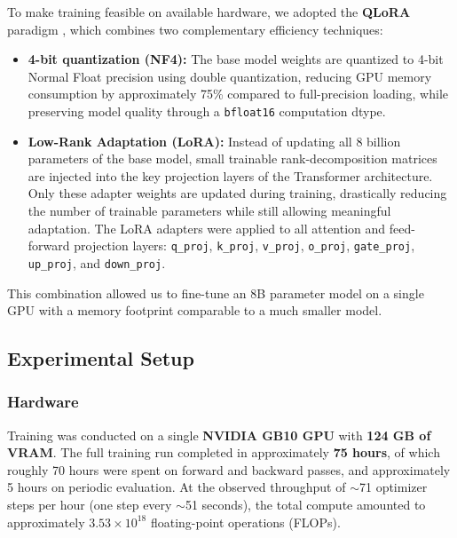 \documentclass[12pt,a4paper]{report}
\begin{document}
To make training feasible on available hardware, we adopted the
\textbf{QLoRA} paradigm \cite{dettmers2023qlora}, which combines two
complementary efficiency techniques:

\begin{itemize}
    \item \textbf{4-bit quantization (NF4):} The base model weights are
    quantized to 4-bit Normal Float precision using double quantization,
    reducing GPU memory consumption by approximately 75\% compared to
    full-precision loading, while preserving model quality through a
    \texttt{bfloat16} computation dtype.

    \item \textbf{Low-Rank Adaptation (LoRA):} Instead of updating all 8
    billion parameters of the base model, small trainable rank-decomposition
    matrices are injected into the key projection layers of the Transformer
    architecture. Only these adapter weights are updated during training,
    drastically reducing the number of trainable parameters while still
    allowing meaningful adaptation. The LoRA adapters were applied to all
    attention and feed-forward projection layers: \texttt{q\_proj},
    \texttt{k\_proj}, \texttt{v\_proj}, \texttt{o\_proj}, \texttt{gate\_proj},
    \texttt{up\_proj}, and \texttt{down\_proj}.
\end{itemize}

This combination allowed us to fine-tune an 8B parameter model on a single
GPU with a memory footprint comparable to a much smaller model.

\subsection{Experimental Setup}

\subsubsection{Hardware}

Training was conducted on a single \textbf{NVIDIA GB10 GPU} with
\textbf{124 GB of VRAM}. The full training run completed in approximately
\textbf{75 hours}, of which roughly 70 hours were spent on forward and
backward passes, and approximately 5 hours on periodic evaluation. At the
observed throughput of $\sim$71 optimizer steps per hour (one step every
$\sim$51 seconds), the total compute amounted to approximately
$3.53 \times 10^{18}$ floating-point operations (FLOPs).
\end{document}

